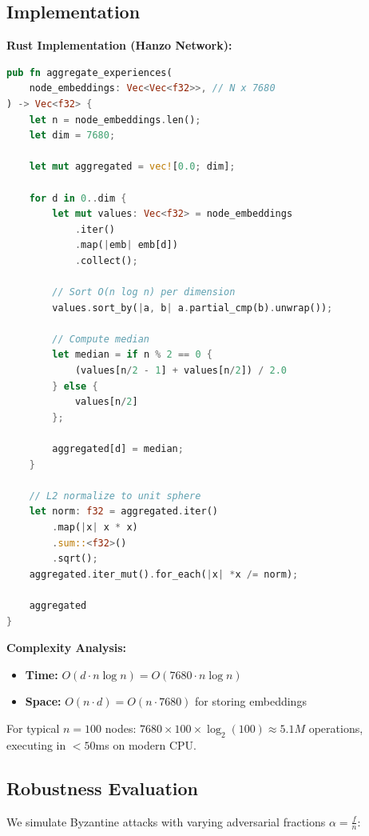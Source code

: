 \subsection{Implementation}

\textbf{Rust Implementation (Hanzo Network):}

\begin{lstlisting}[language=Rust, caption=Byzantine-robust median aggregation, basicstyle=\small\ttfamily]
pub fn aggregate_experiences(
    node_embeddings: Vec<Vec<f32>>, // N x 7680
) -> Vec<f32> {
    let n = node_embeddings.len();
    let dim = 7680;
    
    let mut aggregated = vec![0.0; dim];
    
    for d in 0..dim {
        let mut values: Vec<f32> = node_embeddings
            .iter()
            .map(|emb| emb[d])
            .collect();
        
        // Sort O(n log n) per dimension
        values.sort_by(|a, b| a.partial_cmp(b).unwrap());
        
        // Compute median
        let median = if n % 2 == 0 {
            (values[n/2 - 1] + values[n/2]) / 2.0
        } else {
            values[n/2]
        };
        
        aggregated[d] = median;
    }
    
    // L2 normalize to unit sphere
    let norm: f32 = aggregated.iter()
        .map(|x| x * x)
        .sum::<f32>()
        .sqrt();
    aggregated.iter_mut().for_each(|x| *x /= norm);
    
    aggregated
}
\end{lstlisting}

\textbf{Complexity Analysis:}
\begin{itemize}
\item \textbf{Time:} $O(d \cdot n \log n) = O(7680 \cdot n \log n)$
\item \textbf{Space:} $O(n \cdot d) = O(n \cdot 7680)$ for storing embeddings
\end{itemize}

For typical $n=100$ nodes: $7680 \times 100 \times \log_2(100) \approx 5.1M$ operations, executing in $<50$ms on modern CPU.

\subsection{Robustness Evaluation}

We simulate Byzantine attacks with varying adversarial fractions $\alpha = \frac{f}{n}$:

